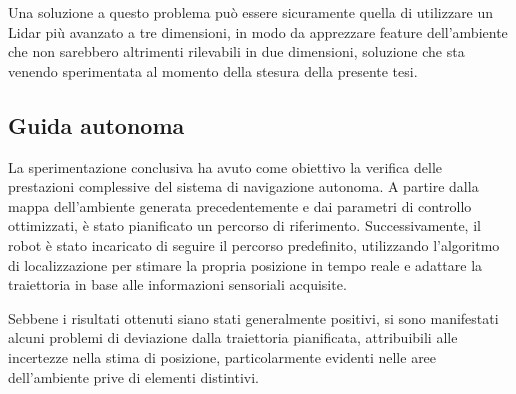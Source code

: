 \noindent Una soluzione a questo problema può essere sicuramente quella di utilizzare un Lidar più avanzato a tre dimensioni, in modo da apprezzare feature dell'ambiente che non sarebbero altrimenti rilevabili in due dimensioni, soluzione che sta venendo sperimentata al momento della stesura della presente tesi.

\subsection{Guida autonoma}
La sperimentazione conclusiva ha avuto come obiettivo la verifica delle prestazioni complessive del sistema di navigazione autonoma. A partire dalla mappa dell'ambiente generata precedentemente e dai parametri di controllo ottimizzati, è stato pianificato un percorso di riferimento. Successivamente, il robot è stato incaricato di seguire il percorso predefinito, utilizzando l'algoritmo di localizzazione per stimare la propria posizione in tempo reale e adattare la traiettoria in base alle informazioni sensoriali acquisite.

\noindent Sebbene i risultati ottenuti siano stati generalmente positivi, si sono manifestati alcuni problemi di deviazione dalla traiettoria pianificata, attribuibili alle incertezze nella stima di posizione, particolarmente evidenti nelle aree dell'ambiente prive di elementi distintivi.
